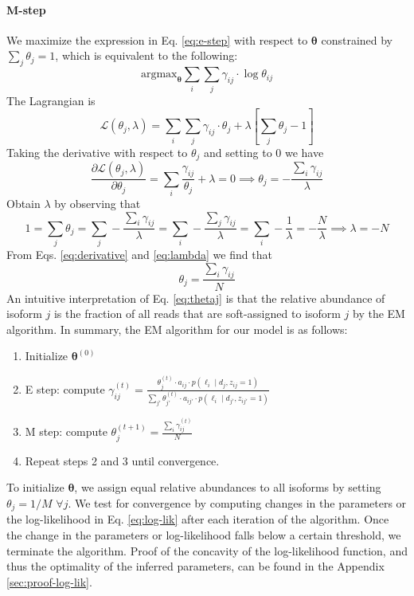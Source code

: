 \paragraph{M-step} We maximize the expression in Eq. \ref{eq:e-step} with respect to $\bm\theta$ constrained by $\sum_j\theta_j=1$, which is equivalent to the following:
\begin{equation}
    \mathrm{argmax}_{\bm\theta}\sum_i\sum_j\gamma_{ij}\cdot\log\theta_{ij}
\end{equation}
The Lagrangian is
\begin{equation}
    \mathcal{L}(\theta_j,\lambda)=\sum_i\sum_j\gamma_{ij}\cdot\theta_j + \lambda\left[\sum_j\theta_j-1\right]
\end{equation}
Taking the derivative with respect to $\theta_j$ and setting to $0$ we have
\begin{equation}
    \frac{\partial\mathcal{L}(\theta_j,\lambda)}{\partial\theta_j}=\sum_i\frac{\gamma_{ij}}{\theta_j}+\lambda=0\implies\theta_j=-\frac{\sum_i\gamma_{ij}}{\lambda}\label{eq:derivative}
\end{equation}
Obtain $\lambda$ by observing that
\begin{equation}
    1=\sum_j\theta_j=\sum_j-\frac{\sum_i\gamma_{ij}}{\lambda}=\sum_i-\frac{\sum_j\gamma_{ij}}{\lambda}=\sum_i-\frac{1}{\lambda}=-\frac{N}{\lambda}\implies\lambda=-N\label{eq:lambda}
\end{equation}
From Eqs. \ref{eq:derivative} and \ref{eq:lambda} we find that
\begin{equation}
    \theta_j=\frac{\sum_i\gamma_{ij}}{N}\label{eq:thetaj}
\end{equation}
An intuitive interpretation of Eq. \ref{eq:thetaj} is that the relative abundance of isoform $j$ is the fraction of all reads that are soft-assigned to isoform $j$ by the EM algorithm. In summary, the EM algorithm for our model is as follows:
\begin{enumerate}
    \item Initialize $\bm{\theta}^{(0)}$
    \item E step: compute $\gamma_{ij}^{(t)}=\frac{\theta_j^{(t)}\cdot a_{ij}\cdot p(\ell_i\mid d_j, z_{ij}=1)}{\sum_{j'}\theta_{j'}^{(t)}\cdot a_{ij'}\cdot p(\ell_i\mid d_{j'}, z_{ij'}=1)}$
    \item M step: compute $\theta_j^{(t+1)}=\frac{\sum_i\gamma_{ij}^{(t)}}{N}$
    \item Repeat steps 2 and 3 until convergence.
\end{enumerate}
To initialize $\bm\theta$, we assign equal relative abundances to all isoforms by setting $\theta_j=1/M$ $\forall j$. We test for convergence by computing changes in the parameters or the log-likelihood in Eq. \ref{eq:log-lik} after each iteration of the algorithm. Once the change in the  parameters or log-likelihood falls below a certain threshold, we terminate the algorithm. Proof of the concavity of the log-likelihood function, and thus the optimality of the inferred parameters, can be found in the Appendix \ref{sec:proof-log-lik}. 
